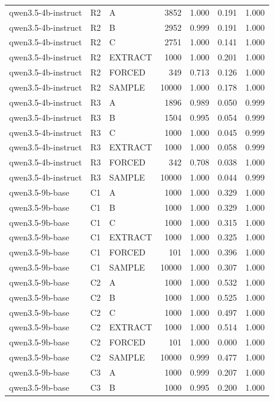 \begin{table}
\begin{tabular}{lllrrrr}
qwen3.5-4b-instruct & R2 & A & 3852 & 1.000 & 0.191 & 1.000 \\
qwen3.5-4b-instruct & R2 & B & 2952 & 0.999 & 0.191 & 1.000 \\
qwen3.5-4b-instruct & R2 & C & 2751 & 1.000 & 0.141 & 1.000 \\
qwen3.5-4b-instruct & R2 & EXTRACT & 1000 & 1.000 & 0.201 & 1.000 \\
qwen3.5-4b-instruct & R2 & FORCED & 349 & 0.713 & 0.126 & 1.000 \\
qwen3.5-4b-instruct & R2 & SAMPLE & 10000 & 1.000 & 0.178 & 1.000 \\
qwen3.5-4b-instruct & R3 & A & 1896 & 0.989 & 0.050 & 0.999 \\
qwen3.5-4b-instruct & R3 & B & 1504 & 0.995 & 0.054 & 0.999 \\
qwen3.5-4b-instruct & R3 & C & 1000 & 1.000 & 0.045 & 0.999 \\
qwen3.5-4b-instruct & R3 & EXTRACT & 1000 & 1.000 & 0.058 & 0.999 \\
qwen3.5-4b-instruct & R3 & FORCED & 342 & 0.708 & 0.038 & 1.000 \\
qwen3.5-4b-instruct & R3 & SAMPLE & 10000 & 1.000 & 0.044 & 0.999 \\
qwen3.5-9b-base & C1 & A & 1000 & 1.000 & 0.329 & 1.000 \\
qwen3.5-9b-base & C1 & B & 1000 & 1.000 & 0.329 & 1.000 \\
qwen3.5-9b-base & C1 & C & 1000 & 1.000 & 0.315 & 1.000 \\
qwen3.5-9b-base & C1 & EXTRACT & 1000 & 1.000 & 0.325 & 1.000 \\
qwen3.5-9b-base & C1 & FORCED & 101 & 1.000 & 0.396 & 1.000 \\
qwen3.5-9b-base & C1 & SAMPLE & 10000 & 1.000 & 0.307 & 1.000 \\
qwen3.5-9b-base & C2 & A & 1000 & 1.000 & 0.532 & 1.000 \\
qwen3.5-9b-base & C2 & B & 1000 & 1.000 & 0.525 & 1.000 \\
qwen3.5-9b-base & C2 & C & 1000 & 1.000 & 0.497 & 1.000 \\
qwen3.5-9b-base & C2 & EXTRACT & 1000 & 1.000 & 0.514 & 1.000 \\
qwen3.5-9b-base & C2 & FORCED & 101 & 1.000 & 0.000 & 1.000 \\
qwen3.5-9b-base & C2 & SAMPLE & 10000 & 0.999 & 0.477 & 1.000 \\
qwen3.5-9b-base & C3 & A & 1000 & 0.999 & 0.207 & 1.000 \\
qwen3.5-9b-base & C3 & B & 1000 & 0.995 & 0.200 & 1.000 \\

\end{tabular}
\end{table}
